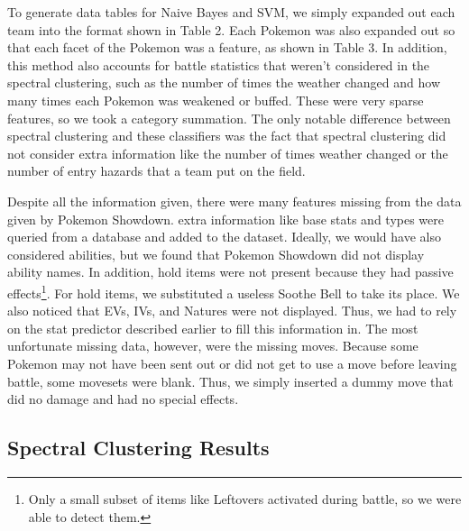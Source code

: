 \documentclass{acm_proc_article-sp}
\begin{document}
To generate data tables for Naive Bayes and SVM, we simply expanded out each team into the format shown in Table 2. Each Pokemon was also expanded out so that each facet of the Pokemon was a feature, as shown in Table 3. In addition, this method also accounts for battle statistics that weren't considered in the spectral clustering, such as the number of times the weather changed and how many times each Pokemon was weakened or buffed. These were very sparse features, so we took a category summation. The only notable difference between spectral clustering and these classifiers was the fact that spectral clustering did not consider extra information like the number of times weather changed or the number of entry hazards that a team put on the field.

Despite all the information given, there were many features missing from the data given by Pokemon Showdown. extra information like base stats and types were queried from a database and added to the dataset. Ideally, we would have also considered abilities, but we found that Pokemon Showdown did not display ability names. In addition, hold items were not present because they had passive effects\footnote{Only a small subset of items like Leftovers activated during battle, so we were able to detect them.}. For hold items, we substituted a useless Soothe Bell to take its place. We also noticed that EVs, IVs, and Natures were not displayed. Thus, we had to rely on the stat predictor described earlier to fill this information in. The most unfortunate missing data, however, were the missing moves. Because some Pokemon may not have been sent out or did not get to use a move before leaving battle, some movesets were blank. Thus, we simply inserted a dummy move that did no damage and had no special effects.

\subsection{Spectral Clustering Results}
\end{document}
